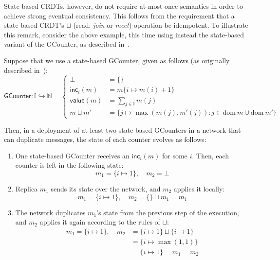 State-based CRDTs, however, do not require at-most-once semantics in order to
achieve strong eventual consistency. This follows from the requirement that a
state-based CRDT's $\sqcup$ (read: \textit{join} or \textit{meet}) operation be
idempotent. To illustrate this remark, consider the above example, this time
using instead the state-based variant of the GCounter, as described
in~\citep{almedia18}.

\begin{example}
  Suppose that we use a state-based GCounter, given as follows (as originally
  described in~\citep{almedia18}):
  \[
    \mathsf{GCounter}
      : \mathbb{I} \hookrightarrow \mathbb{N}
      = \left\{
          \begin{aligned}
            \bot &= \{\} \\
            \mathsf{inc}_i(m) &= m\{ i \mapsto m(i) + 1 \} \\
            \mathsf{value}(m) &= \sum_{j \in \mathbb{I}} m(j) \\
            m \sqcup m' &= \{
              j \mapsto \max(m(j), m'(j)) :
              j \in \mathrm{dom}~m \cup \mathrm{dom}~m'
            \}
          \end{aligned}
        \right.
  \]

  Then, in a deployment of at least two state-based GCounters in a network that
  can duplicate messages, the state of each counter evolves as follows:
  \begin{enumerate}
    \item One state-based GCounter receives an $\mathsf{inc}_i(m)$ for some $i$.
      Then, each counter is left in the following state:
      \[
        m_1 = \{ i \mapsto 1 \},\quad
        m_2 = \bot
      \]
    \item Replica $m_1$ sends its state over the network, and $m_2$ applies it
      locally:
      \[
        m_1 = \{ i \mapsto 1 \},\quad
        m_2 = \{\} \sqcup m_1 = m_1
      \]
    \item The network duplicates $m_1$'s state from the previous step of the
      execution, and $m_2$ applies it again according to the rules of $\sqcup$:
      \[
        \begin{aligned}
          m_1 = \{ i \mapsto 1 \},\quad
          m_2
            &= \{ i \mapsto 1 \} \sqcup \{ i \mapsto 1 \} \\
            &= \{ i \mapsto \max(1, 1) \} \\
            &= \{ i \mapsto 1 \} = m_1 = m_2 \\
        \end{aligned}
      \]
  \end{enumerate}
\end{example}

